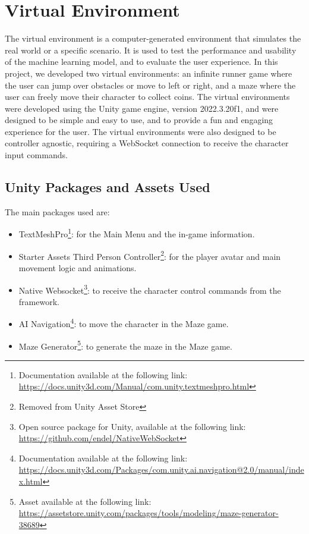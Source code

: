 \section{Virtual Environment}
The virtual environment is a computer-generated environment that simulates the real world or a specific scenario.
It is used to test the performance and usability of the machine learning model, and to evaluate the user experience.
In this project, we developed two virtual environments: an infinite runner game where the user can jump over obstacles or move to left or right, and a maze where the user can freely move their character to collect coins.
The virtual environments were developed using the Unity game engine, version 2022.3.20f1, and were designed to be simple and easy to use, and to provide a fun and engaging experience for the user.
The virtual environments were also designed to be controller agnostic, requiring a WebSocket connection to receive the character input commands.
\subsection*{Unity Packages and Assets Used}
The main packages used are:
\begin{itemize}
    \item TextMeshPro\footnote{Documentation available at the following link: \url{https://docs.unity3d.com/Manual/com.unity.textmeshpro.html}}: for the Main Menu and the in-game information.
    \item Starter Assets \textemdash Third Person Controller\footnote{Removed from Unity Asset Store}: for the player avatar and main movement logic and animations.
    \item Native Websocket\footnote{Open source package for Unity, available at the following link: \url{https://github.com/endel/NativeWebSocket}}: to receive the character control commands from the framework.
    \item AI Navigation\footnote{Documentation available at the following link: \url{https://docs.unity3d.com/Packages/com.unity.ai.navigation@2.0/manual/index.html}}: to move the character in the Maze game.
    \item Maze Generator\footnote{Asset available at the following link: \url{https://assetstore.unity.com/packages/tools/modeling/maze-generator-38689}}: to generate the maze in the Maze game.
\end{itemize}
